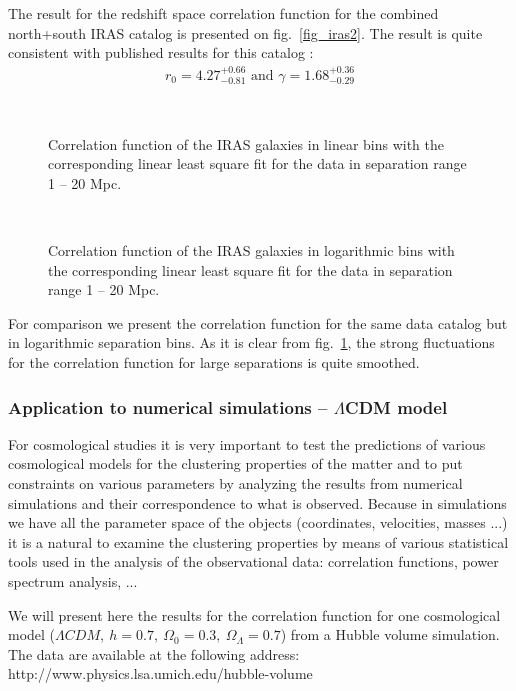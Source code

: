 The result for the redshift space correlation function for the
combined north+south IRAS catalog is presented on
fig.~\ref{fig_iras2}. The result is quite consistent with published
results for this catalog \cite{cf:fisher95}:
\begin{eqnarray}
r_0 = 4.27^{+0.66}_{-0.81} \mbox{ and } \gamma = 1.68^{+0.36}_{-0.29}
\end{eqnarray}

\begin{figure}[htb]
\centerline{
\hbox{
}}
\caption{Correlation function of the IRAS galaxies in linear bins with 
  the corresponding linear least square fit for the data in separation
  range 1 -- 20 Mpc.}
\label{fig_iras2}

\centerline{
\hbox{
}}
\caption{Correlation function of the IRAS galaxies in logarithmic bins with 
  the corresponding linear least square fit for the data in separation 
  range 1 -- 20 Mpc.}
\label{fig_iras3}
\end{figure}
For comparison we present the correlation function for the same data
catalog but in logarithmic separation bins. As it is clear from
fig.~\ref{fig_iras3}, the strong fluctuations for the correlation
function for large separations is quite smoothed.


\subsubsection{Application to numerical simulations -- $\Lambda$CDM
  model}

For cosmological studies it is very important to test the predictions
of various cosmological models for the clustering properties of the
matter and to put constraints on various parameters by analyzing the
results from numerical simulations and their correspondence to what is
observed. Because in simulations we have all the parameter space of
the objects (coordinates, velocities, masses ...) it is a natural to
examine the clustering properties by means of various statistical
tools used in the analysis of the observational data: correlation
functions, power spectrum analysis, ...

We will present here the results for the correlation function for one
cosmological model ($\Lambda CDM,\ h = 0.7,\ \Omega_0 = 0.3,\
\Omega_\Lambda = 0.7$) from a Hubble volume simulation. The data
are available at the following address: \\
http://www.physics.lsa.umich.edu/hubble-volume \\

